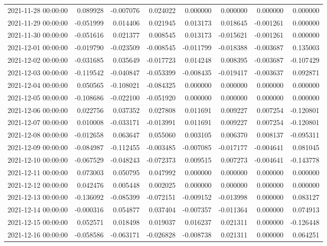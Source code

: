 \begin{tabular}{lrrrrrrr}
2021-11-28 00:00:00 & 0.089928 & -0.007076 & 0.024022 & 0.000000 & 0.000000 & 0.000000 & 0.000000 \\
2021-11-29 00:00:00 & -0.051999 & 0.014406 & 0.021945 & 0.013173 & 0.018645 & -0.001261 & 0.000000 \\
2021-11-30 00:00:00 & -0.051616 & 0.021377 & 0.008545 & 0.013173 & -0.015621 & -0.001261 & 0.000000 \\
2021-12-01 00:00:00 & -0.019790 & -0.023509 & -0.008545 & -0.011799 & -0.018388 & -0.003687 & 0.135003 \\
2021-12-02 00:00:00 & -0.031685 & 0.035649 & -0.017723 & 0.014248 & 0.008395 & -0.003687 & -0.107429 \\
2021-12-03 00:00:00 & -0.119542 & -0.040847 & -0.053399 & -0.008435 & -0.019417 & -0.003637 & 0.092871 \\
2021-12-04 00:00:00 & 0.050565 & -0.108021 & -0.084325 & 0.000000 & 0.000000 & 0.000000 & 0.000000 \\
2021-12-05 00:00:00 & -0.108686 & -0.022100 & -0.051920 & 0.000000 & 0.000000 & 0.000000 & 0.000000 \\
2021-12-06 00:00:00 & 0.022756 & 0.037352 & 0.027808 & 0.011691 & 0.009227 & 0.007254 & -0.120801 \\
2021-12-07 00:00:00 & 0.010008 & -0.033171 & -0.013991 & 0.011691 & 0.009227 & 0.007254 & -0.120801 \\
2021-12-08 00:00:00 & -0.012658 & 0.063647 & 0.055060 & 0.003105 & 0.006370 & 0.008137 & -0.095311 \\
2021-12-09 00:00:00 & -0.084987 & -0.112455 & -0.003485 & -0.007085 & -0.017177 & -0.004641 & 0.081045 \\
2021-12-10 00:00:00 & -0.067529 & -0.048243 & -0.072373 & 0.009515 & 0.007273 & -0.004641 & -0.143778 \\
2021-12-11 00:00:00 & 0.073003 & 0.050795 & 0.047992 & 0.000000 & 0.000000 & 0.000000 & 0.000000 \\
2021-12-12 00:00:00 & 0.042476 & 0.005448 & 0.002025 & 0.000000 & 0.000000 & 0.000000 & 0.000000 \\
2021-12-13 00:00:00 & -0.136092 & -0.085399 & -0.072151 & -0.009152 & -0.013998 & 0.000000 & 0.083127 \\
2021-12-14 00:00:00 & -0.000316 & 0.054877 & 0.037404 & -0.007357 & -0.011364 & 0.000000 & 0.074913 \\
2021-12-15 00:00:00 & 0.052571 & 0.018498 & 0.019037 & 0.016237 & 0.021311 & 0.000000 & -0.126448 \\
2021-12-16 00:00:00 & -0.058586 & -0.063171 & -0.026828 & -0.008738 & 0.021311 & 0.000000 & 0.064251 \\

\end{tabular}
